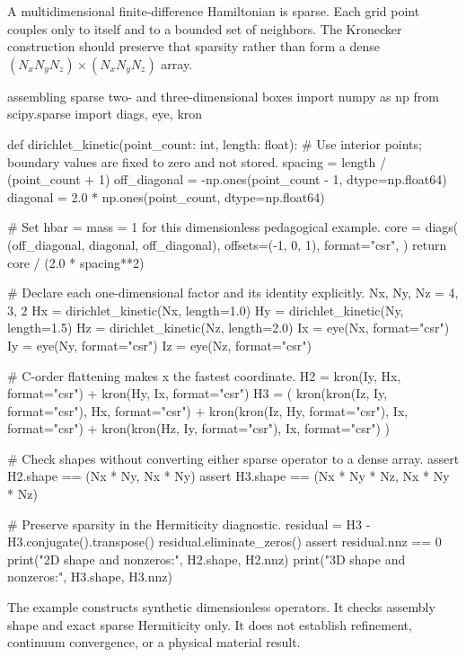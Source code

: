 A multidimensional finite-difference Hamiltonian is sparse. Each grid point
couples only to itself and to a bounded set of neighbors. The Kronecker
construction should preserve that sparsity rather than form a dense
\((N_xN_yN_z)\times(N_xN_yN_z)\) array.

\begin{pythonexample}{assembling sparse two- and three-dimensional boxes}
import numpy as np
from scipy.sparse import diags, eye, kron


def dirichlet_kinetic(point_count: int, length: float):
    # Use interior points; boundary values are fixed to zero and not stored.
    spacing = length / (point_count + 1)
    off_diagonal = -np.ones(point_count - 1, dtype=np.float64)
    diagonal = 2.0 * np.ones(point_count, dtype=np.float64)

    # Set hbar = mass = 1 for this dimensionless pedagogical example.
    core = diags(
        (off_diagonal, diagonal, off_diagonal),
        offsets=(-1, 0, 1),
        format="csr",
    )
    return core / (2.0 * spacing**2)


# Declare each one-dimensional factor and its identity explicitly.
Nx, Ny, Nz = 4, 3, 2
Hx = dirichlet_kinetic(Nx, length=1.0)
Hy = dirichlet_kinetic(Ny, length=1.5)
Hz = dirichlet_kinetic(Nz, length=2.0)
Ix = eye(Nx, format="csr")
Iy = eye(Ny, format="csr")
Iz = eye(Nz, format="csr")

# C-order flattening makes x the fastest coordinate.
H2 = kron(Iy, Hx, format="csr") + kron(Hy, Ix, format="csr")
H3 = (
    kron(kron(Iz, Iy, format="csr"), Hx, format="csr")
    + kron(kron(Iz, Hy, format="csr"), Ix, format="csr")
    + kron(kron(Hz, Iy, format="csr"), Ix, format="csr")
)

# Check shapes without converting either sparse operator to a dense array.
assert H2.shape == (Nx * Ny, Nx * Ny)
assert H3.shape == (Nx * Ny * Nz, Nx * Ny * Nz)

# Preserve sparsity in the Hermiticity diagnostic.
residual = H3 - H3.conjugate().transpose()
residual.eliminate_zeros()
assert residual.nnz == 0
print("2D shape and nonzeros:", H2.shape, H2.nnz)
print("3D shape and nonzeros:", H3.shape, H3.nnz)
\end{pythonexample}

The example constructs synthetic dimensionless operators. It checks assembly
shape and exact sparse Hermiticity only. It does not establish refinement,
continuum convergence, or a physical material result.


